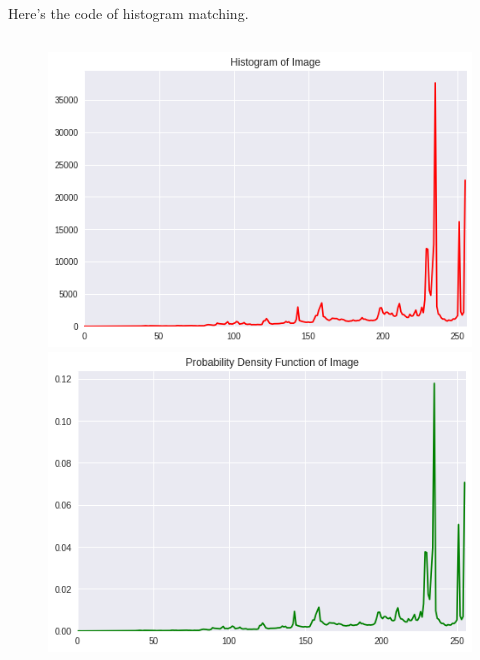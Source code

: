 \documentclass{article}
\begin{document}
\begin{enumerate}[label=B\arabic*)]
		\\
		\\
		Here's the code of histogram matching.
		\\
		\inputminted[tabsize=4, linenos]{Python}{matching.py}
		\begin{figure}[h!]
			\begin{minipage}{0.32\textwidth}
				\centering
				\includegraphics[width=0.9\linewidth]{Chino/Before/Hist.png}
			\end{minipage}
			\hfill
			\begin{minipage}{0.32\textwidth}
				\centering
				\includegraphics[width=0.9\linewidth]{Chino/Before/PDF.png}
			\end{minipage}
			\hfill
			\begin{minipage}{0.32\textwidth}
				\centering

\end{minipage}
\end{figure}
\end{enumerate}
\end{document}
